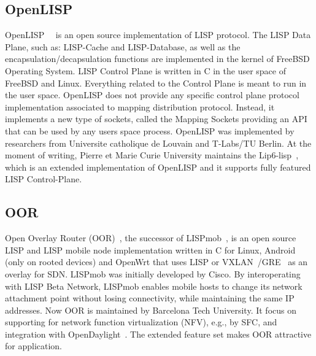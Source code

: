 \subsection{OpenLISP}
\label{subsec:implementation_OpenLISP}
OpenLISP~\cite{OpenLISP}~\cite{phung2014openlisp} is an open source implementation of LISP protocol. The LISP Data Plane, such as: LISP-Cache and LISP-Database, as well as the encapsulation/decapsulation functions are implemented in the kernel of FreeBSD~\cite{freeBSD} Operating System. LISP Control Plane is written in C in the user space of FreeBSD and Linux. Everything related to the Control Plane is meant to run in the user space. OpenLISP does not provide any specific control plane protocol implementation associated to mapping distribution protocol. Instead, it implements a new type of sockets, called the Mapping Sockets providing an API that can be used by any users space process. OpenLISP was implemented by researchers from Universite catholique de Louvain and T-Labs/TU Berlin. At the moment of writing, Pierre et Marie Curie University maintains the Lip6-lisp~\cite{lip6lisp}, which is an extended implementation of OpenLISP and it supports fully featured LISP Control-Plane.


\subsection{OOR}
\label{subsec:implementation_oor}
Open Overlay Router (OOR)~\cite{OOR}, the successor of LISPmob~\cite{cabellos2011lispmob}, is an open source LISP and LISP mobile node implementation written in C for Linux, Android (only on rooted devices) and OpenWrt that uses LISP or VXLAN~\cite{mahalingam2014virtual}/GRE~\cite{hanks2000generic} as an overlay for SDN. LISPmob was initially developed by Cisco. By interoperating with LISP Beta Network, LISPmob enables mobile hosts to change its network attachment point without losing connectivity, while maintaining the same IP addresses. Now OOR is maintained by Barcelona Tech University. It focus on supporting for network function virtualization (NFV), e.g., by SFC, and integration with OpenDaylight~\cite{OpenDaylight}. The extended feature set makes OOR attractive for application.


